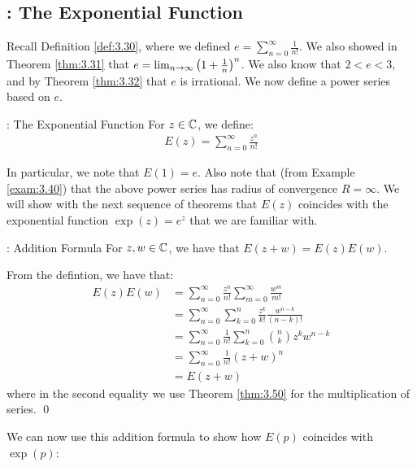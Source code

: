 \subsection{: The Exponential Function}
Recall Definition \ref{def:3.30}, where we defined $e = \sum_{n=0}^\infty \frac{1}{n!}$. We also showed in Theorem \ref{thm:3.31} that $e = \lim_{n \rightarrow \infty}\left(1 + \frac{1}{n}\right)^n$. We also know that $2 < e < 3$, and  by Theorem \ref{thm:3.32} that $e$ is irrational. We now define a power series based on $e$. 

\begin{ndef}{: The Exponential Function}{}
    For $z \in \mathbb{C}$, we define:
    \begin{align*}
        E(z) = \sum_{n=0}^\infty \frac{z^n}{n!}
    \end{align*}
\end{ndef}
\noindent In particular, we note that $E(1) = e$. Also note that (from Example \ref{exam:3.40}) that the above power series has radius of convergence $R = \infty$. We will show with the next sequence of theorems that $E(z)$ coincides with the exponential function $\exp(z) = e^z$ that we are familiar with.

\begin{ntheorem}{: Addition Formula}{}
    For $z, w \in \mathbb{C}$, we have that $E(z + w) = E(z)E(w)$.
\end{ntheorem}
\begin{nproof}
    From the defintion, we have that:
    \begin{align*}
        E(z)E(w) &= \sum_{n=0}^\infty \frac{z^n}{n!}\sum_{m=0}^\infty\frac{w^m}{m!}
        \\ &= \sum_{n=0}^\infty \sum_{k=0}^n \frac{z^k}{k!}\frac{w^{n-k}}{(n-k)!}
        \\ &= \sum_{n=0}^\infty \frac{1}{n!}\sum_{k=0}^n\binom{n}{k}z^kw^{n-k}
        \\ &= \sum_{n=0}^\infty \frac{1}{n!}(z + w)^n
        \\ &= E(z + w)
    \end{align*}
    where in the second equality we use Theorem \ref{thm:3.50} for the multiplication of series. \qed
\end{nproof}
\noindent We can now use this addition formula to show how $E(p)$ coincides with $\exp(p)$:

